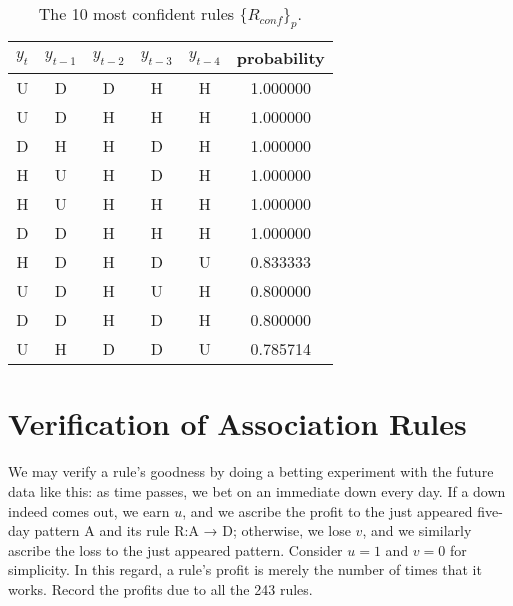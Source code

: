\documentclass[runningheads]{llncs}
\begin{document}
\begin{table}
    \centering
    \caption{The 10 most confident rules $\{R_{conf}\}_p$.}
    \label{tab:conf}
    \begin{tabularx}{\textwidth}{|C|C|C|C|C|C|}
        \hline
        $y_{t}$ & $y_{t-1}$ & $y_{t-2}$ & $y_{t-3}$ & $y_{t-4}$ & probability \\
        \hline
        U       & D         & D         & H         & H         & 1.000000    \\
        U       & D         & H         & H         & H         & 1.000000    \\
        D       & H         & H         & D         & H         & 1.000000    \\
        H       & U         & H         & D         & H         & 1.000000    \\
        H       & U         & H         & H         & H         & 1.000000    \\
        D       & D         & H         & H         & H         & 1.000000    \\
        H       & D         & H         & D         & U         & 0.833333    \\
        U       & D         & H         & U         & H         & 0.800000    \\
        D       & D         & H         & D         & H         & 0.800000    \\
        U       & H         & D         & D         & U         & 0.785714    \\
        \hline
    \end{tabularx}
\end{table}

\section{Verification of Association Rules}
We may verify a rule's goodness by doing a betting experiment with the future data like this: as time passes, we bet on an immediate down every day.
If a down indeed comes out, we earn $u$, and we ascribe the profit to the just appeared five-day pattern A and its rule R:A → D; otherwise, we lose $v$,
and we similarly ascribe the loss to the just appeared pattern.
Consider $u = 1$ and $v = 0$ for simplicity. In this regard, a rule's profit is merely the number of times that it works.
Record the profits due to all the 243 rules.
\end{document}
